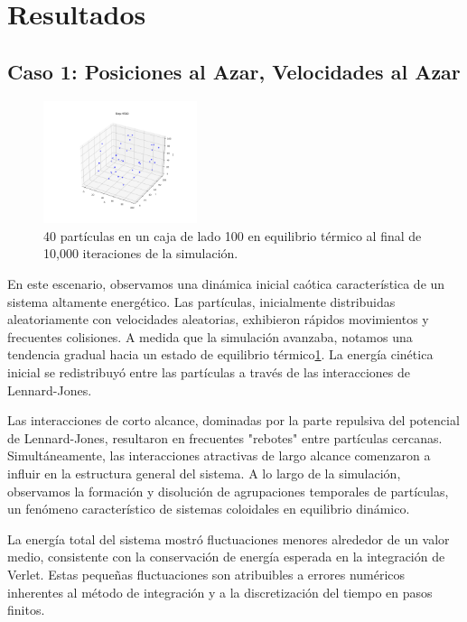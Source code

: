 \documentclass[twocolumn]{article}
\begin{document}
\section{Resultados}

\subsection*{Caso 1: Posiciones al Azar, Velocidades al Azar}

\begin{figure}[h]
    \centering
    \includegraphics[width=0.4\textwidth]{figures/40p_10ki_11.png}
    \caption{40 partículas en un caja de lado 100 en equilibrio térmico al final de 10,000 iteraciones de la simulación.}
    \label{fig:case1_equilibrio}
\end{figure}

En este escenario, observamos una dinámica inicial caótica característica de un sistema altamente energético. Las partículas, inicialmente distribuidas aleatoriamente con velocidades aleatorias, exhibieron rápidos movimientos y frecuentes colisiones. A medida que la simulación avanzaba, notamos una tendencia gradual hacia un estado de equilibrio térmico\ref{fig:case1_equilibrio}. La energía cinética inicial se redistribuyó entre las partículas a través de las interacciones de Lennard-Jones.

Las interacciones de corto alcance, dominadas por la parte repulsiva del potencial de Lennard-Jones, resultaron en frecuentes "rebotes" entre partículas cercanas. Simultáneamente, las interacciones atractivas de largo alcance comenzaron a influir en la estructura general del sistema. A lo largo de la simulación, observamos la formación y disolución de agrupaciones temporales de partículas, un fenómeno característico de sistemas coloidales en equilibrio dinámico.

La energía total del sistema mostró fluctuaciones menores alrededor de un valor medio, consistente con la conservación de energía esperada en la integración de Verlet. Estas pequeñas fluctuaciones son atribuibles a errores numéricos inherentes al método de integración y a la discretización del tiempo en pasos finitos.
\end{document}
